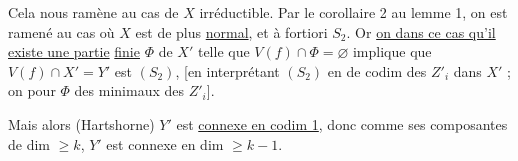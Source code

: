 Cela nous ramène au cas de $X$ irréductible. Par le corollaire 2 au lemme 1, on est ramené au cas où $X$ est de plus \uline{normal}, et à fortiori $S_2$. Or \uline{on  dans ce cas qu'il existe une partie} \uline{finie} $\Phi$ de $X'$ telle que $V(f)\cap\Phi=\varnothing$ implique que $V(f)\cap X'=Y'$ est $(S_2)$, [en interprétant $(S_2)$ en  de codim des $Z'_i$ dans $X'$ ; on  pour $\Phi$  des  minimaux des  $Z'_i$].

Mais alors (Hartshorne) $Y'$ est \uline{connexe en codim 1}, donc comme ses composantes  de dim $\geq k$, $Y'$ est connexe en dim $\geq k-1$.

